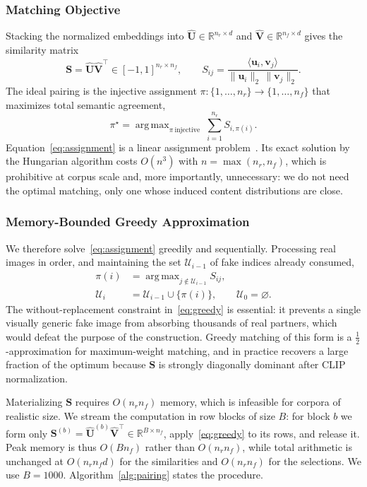 \documentclass[10pt,journal]{IEEEtran}
\newcommand{\vect}[1]{\boldsymbol{#1}}
\newcommand{\mat}[1]{\mathbf{#1}}
\newcommand{\real}{\mathbb{R}}
\DeclareMathOperator*{\argmax}{arg\,max}
\begin{document}
\subsubsection{Matching Objective}
Stacking the normalized embeddings into
$\hat{\mat{U}}\in\real^{n_r\times d}$ and
$\hat{\mat{V}}\in\real^{n_f\times d}$ gives the similarity matrix
\begin{equation}
\mat{S}=\hat{\mat{U}}\hat{\mat{V}}^{\!\top}\in[-1,1]^{n_r\times n_f},
\qquad
S_{ij}=\frac{\langle\vect{u}_i,\vect{v}_j\rangle}
             {\lVert\vect{u}_i\rVert_2\,\lVert\vect{v}_j\rVert_2}.
\label{eq:sim}
\end{equation}
The ideal pairing is the injective assignment $\pi:\{1,\dots,n_r\}\to
\{1,\dots,n_f\}$ that maximizes total semantic agreement,
\begin{equation}
\pi^\star=\argmax_{\pi\ \text{injective}}\ \sum_{i=1}^{n_r}S_{i,\pi(i)} .
\label{eq:assignment}
\end{equation}
Equation~\eqref{eq:assignment} is a linear assignment
problem~\cite{kuhn1955hungarian,burkard2012assignment}. Its exact solution by
the Hungarian algorithm costs $O(n^3)$ with $n=\max(n_r,n_f)$, which is
prohibitive at corpus scale and, more importantly, unnecessary: we do not need
the optimal matching, only one whose induced content distributions are close.

\subsubsection{Memory-Bounded Greedy Approximation}
We therefore solve~\eqref{eq:assignment} greedily and sequentially. Processing
real images in order, and maintaining the set $\mathcal{U}_{i-1}$ of fake
indices already consumed,
\begin{align}
\pi(i)&=\argmax_{j\notin\mathcal{U}_{i-1}} S_{ij},
\label{eq:greedy}\\
\mathcal{U}_i&=\mathcal{U}_{i-1}\cup\{\pi(i)\},\qquad \mathcal{U}_0=\varnothing .
\end{align}
The without-replacement constraint in~\eqref{eq:greedy} is essential: it
prevents a single visually generic fake image from absorbing thousands of real
partners, which would defeat the purpose of the construction. Greedy matching
of this form is a $\tfrac{1}{2}$-approximation for maximum-weight matching, and
in practice recovers a large fraction of the optimum because $\mat{S}$ is
strongly diagonally dominant after CLIP normalization.

Materializing $\mat{S}$ requires $O(n_r n_f)$ memory, which is infeasible for
corpora of realistic size. We stream the computation in row blocks of size
$B$: for block $b$ we form only $\mat{S}^{(b)}=\hat{\mat{U}}^{(b)}
\hat{\mat{V}}^{\!\top}\in\real^{B\times n_f}$, apply~\eqref{eq:greedy} to its
rows, and release it. Peak memory is thus $O(Bn_f)$ rather than
$O(n_r n_f)$, while total arithmetic is unchanged at $O(n_r n_f d)$ for the
similarities and $O(n_r n_f)$ for the selections. We use $B=1000$.
Algorithm~\ref{alg:pairing} states the procedure.
\end{document}
